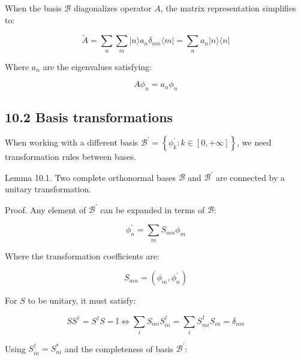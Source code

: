 \documentclass[italian]{HKNdocument}
\begin{document}
When the basis $\mathcal{B}$ diagonalizes operator $A$, the matrix representation simplifies to:

\begin{equation*}
\tilde{A}=\sum_{n} \sum_{m}|n\rangle a_{n} \delta_{n m}\langle m|=\sum_{n} a_{n}|n\rangle\langle n| \tag{10.9}
\end{equation*}

Where $a_n$ are the eigenvalues satisfying:

\begin{equation*}
A \phi_{n}=a_{n} \phi_{n} \tag{10.10}
\end{equation*}

\subsection*{10.2 Basis transformations}
When working with a different basis $\mathcal{B}^{\prime}=\left\{\phi_{k}^{\prime}: k \in[0,+\infty]\right\}$, we need transformation rules between bases.

Lemma 10.1. Two complete orthonormal bases $\mathcal{B}$ and $\mathcal{B}^{\prime}$ are connected by a unitary transformation.

Proof. Any element of $\mathcal{B}^{\prime}$ can be expanded in terms of $\mathcal{B}$:

\begin{equation*}
\phi_{n}^{\prime}=\sum_{m} S_{m n} \phi_{m} \tag{10.11}
\end{equation*}

Where the transformation coefficients are:

\begin{equation*}
S_{m n}=\left(\phi_{m}, \phi_{n}^{\prime}\right) \tag{10.12}
\end{equation*}

For $S$ to be unitary, it must satisfy:

\begin{equation*}
S S^{\dagger}=S^{\dagger} S=\mathbb{I} \Longleftrightarrow \sum_{i} S_{m i} S_{i n}^{\dagger}=\sum_{i} S_{m i}^{\dagger} S_{i n}=\delta_{n m} \tag{10.13}
\end{equation*}

Using $S_{i n}^{\dagger}=S_{n i}^{*}$ and the completeness of basis $\mathcal{B}^{\prime}$:
\end{document}
